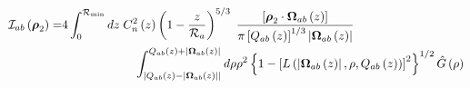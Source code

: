 \begin{equation}\label{caliph_I}
\begin{split}
\mathcal{I}_{ab}\left(\boldsymbol{\rho}_{2}\right) = & 
4 \int_{0}^{\mathcal{R}_{\rm min}} dz \; C_{n}^{2}\left(z\right) \left( 1 - \frac{z}{\mathcal{R}_{a}}\right)^{5/3}\; 
\frac{\left[\boldsymbol{\rho}_{2}\cdot\boldsymbol{\Omega}_{ab}\left(z\right)\right] }{\pi \left[Q_{ab}\left(z\right)\right]^{1/3} 
\left\vert\boldsymbol{\Omega}_{ab}\left(z\right)\right\vert} \\
& 
\quad\quad\quad\quad\quad\quad
\int^{Q_{ab}\left(z\right) +\left\vert \boldsymbol{\Omega}_{ab}\left(z\right)\right\vert}_{\left\vert Q_{ab}\left(z\right) - \left\vert\boldsymbol{\Omega}_{ab}\left(z\right)\right\vert\right\vert}
d\rho \rho^{2} \left\{1 - \left[L\left(\left\vert\boldsymbol{\Omega}_{ab}\left(z\right)\right\vert, \rho, Q_{ab}\left(z\right)\right)\right]^{2}\right\}^{1/2} 
\hat{G}\left(\rho\right)
\end{split}
\end{equation}

